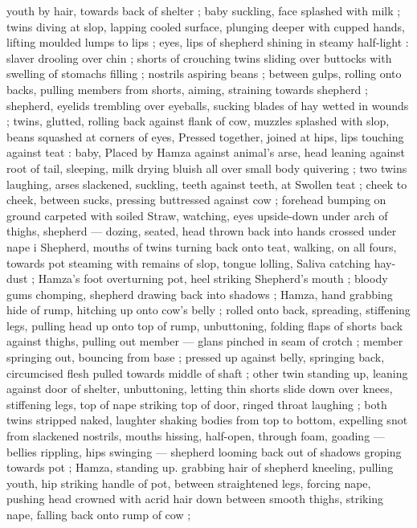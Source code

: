 youth by hair, towards back of shelter ; baby suckling, face splashed 
with milk ; twins diving at slop, lapping cooled surface, plunging 
deeper with cupped hands, lifting moulded lumps to lips ; eyes, lips 
of shepherd shining in steamy half-light : slaver drooling over chin ; 
shorts of crouching twins sliding over buttocks with swelling of 
stomachs filling ; nostrils aspiring beans ; between gulps, rolling onto 
backs, pulling members from shorts, aiming, straining towards 
shepherd ; shepherd, eyelids trembling over eyeballs, sucking blades 
of hay wetted in wounds ; twins, glutted, rolling back against flank of 
cow, muzzles splashed with slop, beans squashed at corners of eyes, 
Pressed together, joined at hips, lips touching against teat : baby, 
Placed by Hamza against animal's arse, head leaning against root of 
tail, sleeping, milk drying bluish all over small body quivering ; two 
twins laughing, arses slackened, suckling, teeth against teeth, at 
Swollen teat ; cheek to cheek, between sucks, pressing buttressed 
against cow ; forehead bumping on ground carpeted with soiled 
Straw, watching, eyes upside-down under arch of thighs, shepherd 
--- dozing, seated, head thrown back into hands crossed under nape 
i Shepherd, mouths of twins turning back onto teat, walking, on all 
fours, towards pot steaming with remains of slop, tongue lolling, 
Saliva catching hay-dust ; Hamza's foot overturning pot, heel striking 
Shepherd's mouth ; bloody gums chomping, shepherd drawing back 
into shadows ; Hamza, hand grabbing hide of rump, hitching up onto 
cow's belly ; rolled onto back, spreading, stiffening legs, pulling 
head up onto top of rump, unbuttoning, folding flaps of shorts back 
against thighs, pulling out member --- glans pinched in seam of 
crotch ; member springing out, bouncing from base ; pressed up 
against belly, springing back, circumcised flesh pulled towards 
middle of shaft ; other twin standing up, leaning against door of 
shelter, unbuttoning, letting thin shorts slide down over knees, 
stiffening legs, top of nape striking top of door, ringed throat 
laughing ; both twins stripped naked, laughter shaking bodies from 
top to bottom, expelling snot from slackened nostrils, mouths 
hissing, half-open, through foam, goading --- bellies rippling, hips 
swinging --- shepherd looming back out of shadows groping towards 
pot ; Hamza, standing up. grabbing hair of shepherd kneeling, 
pulling youth, hip striking handle of pot, between straightened legs, 
forcing nape, pushing head crowned with acrid hair down between 
smooth thighs, striking nape, falling back onto rump of cow ; 
